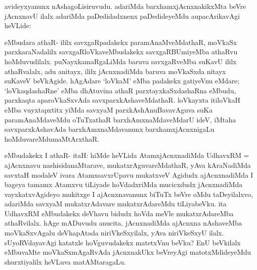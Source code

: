 \begin{artha}
avideyxyanunx nAshagoLisiruvudu. adariMda barxhamxjAcnxnakikxMta beVre jAcnxnavU ilalx adariMda paDedidadxnenx paDedideyeMdu aupacArikavAgi heVLide:
\end{artha}


\begin{artha}
eMbudara athaR- ililx savxgaRpadakekx paramAnaMveMdathaR, moVkaSx parxkaraNadalilx savxgaRloVkaveMbudakekx savxgaRBUmiyeMba athaRvu hoMduvudilalx. puNayxkamaRgaLiMda baruva savxgaRveMba suKavU ililx athaRvalalx, adu anitayx, ililx jAcnxnadiMda baruva moVkaSxda nitayx suKaveV beVkAgide. hAgAdare `loVkaM' eMba padakekx gatiyeVnu eMdare; `loVkaqdashaRne' eMba dhAtuvina athaR parxtayxkaSxdashaRna eMbudu, parxkaqta aparoVkaSxvAda savxparxkAshaveMdathaR. loVkayxta itiloVkaH eMba vuyxtapxtitx yiMda savxyaM parxkAshAnuBavavAguva suKa paramAnaMdaveMdu oTuTxathaR barxhAmxnaMdaveMdarU ideV, iMtaha savxparxkAshavAda barxhAmxnaMdavanunx barxhamxjAcnxnigaLu hoMduvareMdu\break maMtArxthaR. 
\end{artha}


\begin{artha}
eMbudakekx I athaR- itaH: hiMde heVLida AtamxjAcnxnadiMda UdhavxRM = ajAcnxnavu nashisidanaMtarave, mukatxrAguvareMdathaR, yAva kAraNadiMda savxtaH modaleV ivara AtamxsavxrUpavu mukatxveV Agidudx ajAcnxnadiMda I bageya tamamx Atamxvu tiLiyade hoVdadxriMda mucicxdudx jAcnxnadiMda vayxkatxvAgideyo mukitxge I ajAcnxnavanunx biTuTx beVre oMdu taDeyilalxvo, adariMda savxyaM mukatxrAdavare mukatxrAdareMdu tiLiyabeVku. ita UdhavxRM eMbudakekx deVhavu bidudx hoVda meVle mukatxrAdareMba athaRvilalx. hAge mADuvudu anucita. jAcnxnadiMda ajAcnxna nAshaveMba moVkaSxvAgalu deVhapAtada niriVkeSxyilalx, yAva niriVkeSxyU ilalx. sUyoRVdayavAgi katatxle hoVguvudakekx matetxVnu beVku? EnU beVkilalx eMbuvaMte moVkaSxmAgaRvAda jAcnxnakUkx beVreyAgi matotxMdideyeMdu shurxtiyalilx \ndash  heVLuva matAMtaragaLu.
\end{artha}


